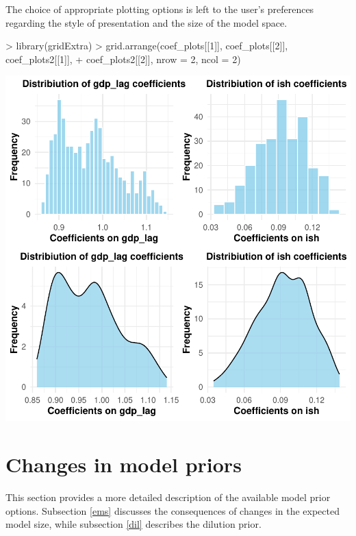\documentclass[a4paper]{article}
\begin{document}
The choice of appropriate plotting options is left to the user's preferences regarding the style of presentation and the size of the model space.
\begin{Schunk}
\begin{Sinput}
> library(gridExtra)
> grid.arrange(coef_plots[[1]], coef_plots[[2]], coef_plots2[[1]],
+              coef_plots2[[2]], nrow = 2, ncol = 2)
\end{Sinput}
\end{Schunk}
\includegraphics{bdsm_vignette-025}

\section{Changes in model priors}\label{priors}
This section provides a more detailed description of the available model prior options.
Subsection \ref{ems} discusses the consequences of changes in the expected model size, while subsection \ref{dil} describes the dilution prior.
\end{document}
